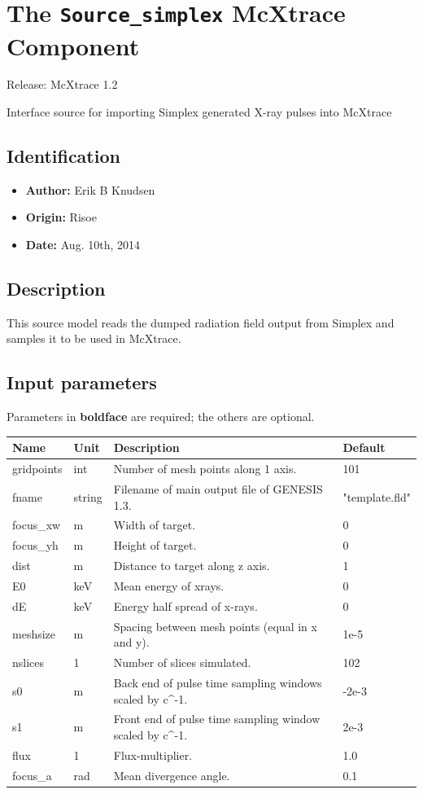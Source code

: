 \section{The \texttt{Source\_simplex} McXtrace Component}
Release: McXtrace 1.2

Interface source for importing Simplex generated X-ray pulses into McXtrace

\subsection*{Identification}
\begin{itemize}
  \item \textbf{Author:} Erik B Knudsen
  \item \textbf{Origin:} Risoe
  \item \textbf{Date:} Aug. 10th, 2014
\end{itemize}

\subsection*{Description}
This source model reads the dumped radiation field output from Simplex and samples it to be used in McXtrace.

\subsection*{Input parameters}
Parameters in \textbf{boldface} are required; the others are optional.

\begin{longtable}{p{}p{}p{}p{}}
\toprule
\textbf{Name} & \textbf{Unit} & \textbf{Description} & \textbf{Default} \\
\midrule
\endhead
gridpoints & int & Number of mesh points along 1 axis. & 101 \\
fname & string & Filename of main output file of GENESIS 1.3. & "template.fld" \\
focus\_xw & m & Width of target. & 0 \\
focus\_yh & m & Height of target. & 0 \\
dist & m & Distance to target along z axis. & 1 \\
E0 & keV & Mean energy of xrays. & 0 \\
dE & keV & Energy half spread of x-rays. & 0 \\
meshsize & m & Spacing between mesh points (equal in x and y). & 1e-5 \\
nslices & 1 & Number of slices simulated. & 102 \\
s0 & m & Back end of pulse time sampling windows scaled by c\textasciicircum{}-1. & -2e-3 \\
s1 & m & Front end of pulse time sampling window scaled by c\textasciicircum{}-1. & 2e-3 \\
flux & 1 & Flux-multiplier. & 1.0 \\
focus\_a & rad & Mean divergence angle. & 0.1 \\
\bottomrule
\end{longtable}

